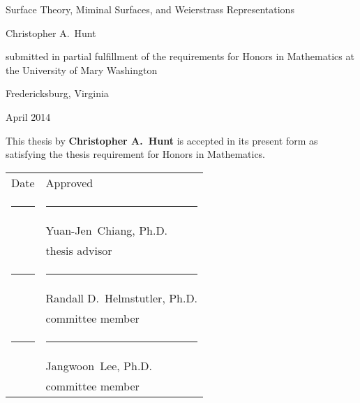 \documentclass[11pt]{article}
\theoremstyle{definition}
\theoremstyle{remark}
\begin{document}


\protect{\thispagestyle{empty}}

\begin{center}

\LARGE

\phantom{1}

\vspace{1.5in}

\sc Surface Theory, Miminal Surfaces, and Weierstrass Representations \normalfont

\Large

\vspace{1.0in}

Christopher A.\ Hunt

\vfill

submitted in partial fulfillment of the requirements for Honors in Mathematics at the
University of Mary Washington

\vspace{0.5in}

Fredericksburg, Virginia

\vspace{0.5in}

April 2014

\normalsize

\vspace{1.0in}

\end{center}

\pagebreak



\protect{\thispagestyle{empty}}

\phantom{1}

\vspace{0.5in}

\noindent  This thesis by \textbf{Christopher A.\ Hunt} is accepted in its present form as satisfying the thesis requirement
for Honors in Mathematics.

\vspace{1.0in}


\begin{tabular}{p{1.0in}l}
\sc Date & \sc Approved \\[.65in]
\rule{0.85in}{0.5pt} & \rule{2.6in}{0.5pt}\\
& Yuan-Jen\ Chiang, Ph.D.\\    %
& thesis advisor\\[.65in]
\rule{0.85in}{0.5pt} & \rule{2.6in}{0.5pt}\\
& Randall D.\ Helmstutler, Ph.D.\\  %
& committee member\\[.65in]
\rule{0.85in}{0.5pt} & \rule{2.6in}{0.5pt}\\
& Jangwoon\ Lee, Ph.D.\\   %
& committee member
\end{tabular}
\end{document}

